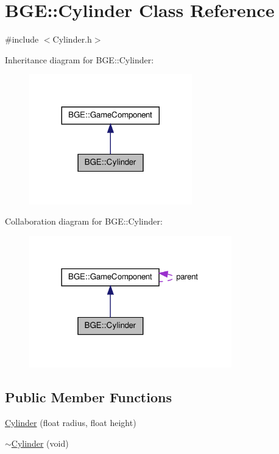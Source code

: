 \hypertarget{class_b_g_e_1_1_cylinder}{\section{B\-G\-E\-:\-:Cylinder Class Reference}
\label{class_b_g_e_1_1_cylinder}
}


{\ttfamily \#include $<$Cylinder.\-h$>$}



Inheritance diagram for B\-G\-E\-:\-:Cylinder\-:
\nopagebreak
\begin{figure}[H]
\begin{center}
\leavevmode
\includegraphics[width=200pt]{class_b_g_e_1_1_cylinder__inherit__graph}
\end{center}
\end{figure}


Collaboration diagram for B\-G\-E\-:\-:Cylinder\-:
\nopagebreak
\begin{figure}[H]
\begin{center}
\leavevmode
\includegraphics[width=249pt]{class_b_g_e_1_1_cylinder__coll__graph}
\end{center}
\end{figure}
\subsection*{Public Member Functions}
\begin{DoxyCompactItemize}
\item 
\hyperlink{class_b_g_e_1_1_cylinder_a7fc7f1cbffd048f423f7c0194c972348}{Cylinder} (float radius, float height)
\item 
\hyperlink{class_b_g_e_1_1_cylinder_a1ce9a64d1d2b24459affa535f3e2092d}{$\sim$\-Cylinder} (void)
\end{DoxyCompactItemize}
